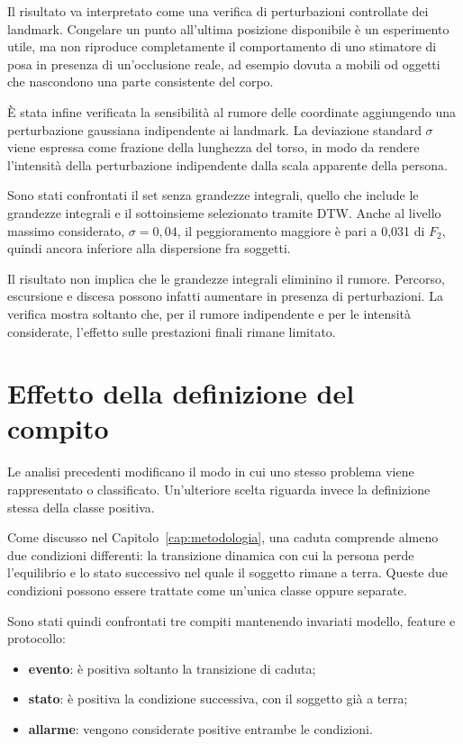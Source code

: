 Il risultato va interpretato come una verifica di perturbazioni controllate dei landmark. Congelare un punto all'ultima posizione disponibile è un esperimento utile, ma non riproduce completamente il comportamento di uno stimatore di posa in presenza di un'occlusione reale, ad esempio dovuta a mobili od oggetti che nascondono una parte consistente del corpo.

È stata infine verificata la sensibilità al rumore delle coordinate aggiungendo una perturbazione gaussiana indipendente ai landmark. La deviazione standard $\sigma$ viene espressa come frazione della lunghezza del torso, in modo da rendere l'intensità della perturbazione indipendente dalla scala apparente della persona.

Sono stati confrontati il set senza grandezze integrali, quello che include le grandezze integrali e il sottoinsieme selezionato tramite DTW. Anche al livello massimo considerato, $\sigma=0{,}04$, il peggioramento maggiore è pari a 0,031 di $F_2$, quindi ancora inferiore alla dispersione fra soggetti.

Il risultato non implica che le grandezze integrali eliminino il rumore. Percorso, escursione e discesa possono infatti aumentare in presenza di perturbazioni. La verifica mostra soltanto che, per il rumore indipendente e per le intensità considerate, l'effetto sulle prestazioni finali rimane limitato.

\section{Effetto della definizione del compito}
\label{sec:compito-risultati}

Le analisi precedenti modificano il modo in cui uno stesso problema viene rappresentato o classificato. Un'ulteriore scelta riguarda invece la definizione stessa della classe positiva.

Come discusso nel Capitolo~\ref{cap:metodologia}, una caduta comprende almeno due condizioni differenti: la transizione dinamica con cui la persona perde l'equilibrio e lo stato successivo nel quale il soggetto rimane a terra. Queste due condizioni possono essere trattate come un'unica classe oppure separate.

Sono stati quindi confrontati tre compiti mantenendo invariati modello, feature e protocollo:

\begin{itemize}
    \item \textbf{evento}: è positiva soltanto la transizione di caduta;
    \item \textbf{stato}: è positiva la condizione successiva, con il soggetto
          già a terra;
    \item \textbf{allarme}: vengono considerate positive entrambe le
          condizioni.
\end{itemize}

